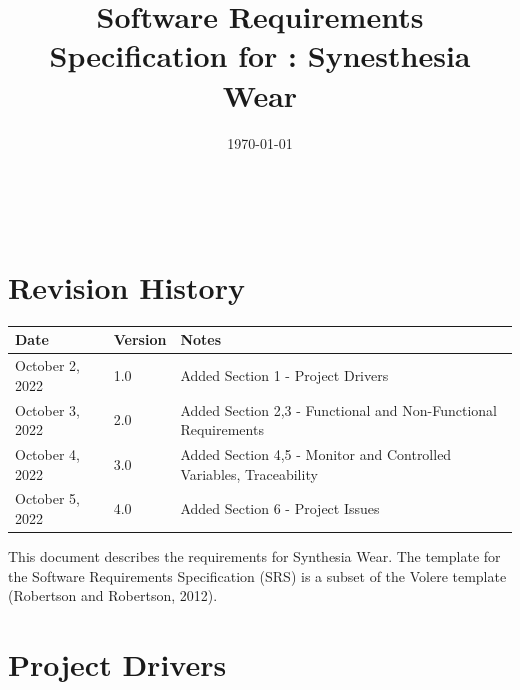 \documentclass[12pt]{article}
\begin{document}
\title{Software Requirements Specification for \progname: Synesthesia Wear} 
\author{\authname}
\date{\today}
	
\maketitle

~\newpage


\tableofcontents

\pagebreak

\section*{Revision History}

\begin{tabularx}{\textwidth}{p{3cm}p{2cm}X}
\toprule {\bf Date} & {\bf Version} & {\bf Notes}\\
\midrule
October 2, 2022 & 1.0 & Added Section 1 - Project Drivers\\

October 3, 2022 & 2.0 & Added Section 2,3 - Functional and Non-Functional Requirements\\

October 4, 2022 & 3.0 & Added Section 4,5 - Monitor and Controlled Variables, Traceability  \\
October 5, 2022 & 4.0 & Added Section 6 -  Project Issues \\
\bottomrule
\end{tabularx}

\vspace{5mm}
This document describes the requirements for Synthesia Wear.
The template for the Software Requirements Specification (SRS)
is a subset of the Volere template (Robertson and Robertson, 2012).

\section{Project Drivers}
\end{document}
